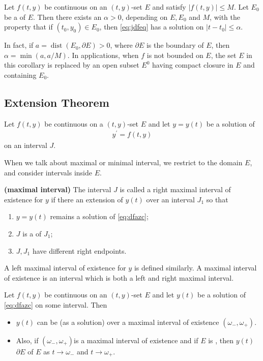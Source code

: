 \documentclass{article}
\newcommand{\bfs}[1]{\textbf{({#1}) }}
\begin{document}
\begin{cora}\label{cor:oeqwklds}
Let $f(t, y)$ be continuous on an  $(t, y)$-set $E$ and satisfy $|f(t, y)| \le M$. Let $E_{0}$ be a  of $E$. Then there exists an $\alpha>0$, depending on $E, E_{0}$ and $M$, with the property that if $\left(t_{0}, y_{0}\right) \in E_{0}$, then \cref{eq:jdfeq} has a solution on $\left|t-t_{0}\right| \le \alpha$.
\end{cora} 
\begin{rema}
In fact, if $a=\operatorname{dist}\left(E_{0}, \partial E\right)>0$, where $\partial E$ is the boundary of $E$, then $\alpha=\min (a, a / M)$. In applications, when $f$ is not bounded on $E$, the set $E$ in this corollary is replaced by an open subset $E^{0}$ having compact closure in $E$ and containing $E_{0}$.

\end{rema}

\subsection{Extension Theorem}
Let $f(t, y)$ be continuous on a $(t, y)$-set $E$ and let $y=y(t)$ be a solution of
\begin{align}
  y^{\prime}=f(t, y)  \label{eq:dfazc}
\end{align}
on an interval $J$. 
\begin{rema}
When we talk about maximal or minimal interval, we restrict to the domain $E$, and consider intervals inside $E$.
\end{rema}
\begin{defa}\bfs{maximal interval}
The interval $J$ is called a right maximal interval of existence for $y$ if there  an extension of $y(t)$ over an interval $J_{1}$ so that
\begin{enumerate}
    \item $y=y(t)$ remains a solution of \cref{eq:dfazc}; 
    \item $J$ is a  of $J_{1}$; 
    \item $J, J_{1}$ have different right endpoints. 
\end{enumerate}

A left maximal interval of existence for $y$ is defined similarly. A maximal interval of existence is an interval which is both a left and right maximal interval.
\end{defa}
\begin{thma}\label{thm:extensiontheorem}
Let $f(t, y)$ be continuous on an  $(t, y)$-set $E$ and let $y(t)$ be a solution of \cref{eq:dfazc} on some interval. Then 
\begin{itemize}
    \item $y(t)$ can be  (as a solution) over a maximal interval of existence $\left(\omega_{-}, \omega_{+}\right)$.
    \item Also, if $\left(\omega_{-}, \omega_{+}\right)$is a maximal interval of existence and if $E$ is , then $y(t)$  $\partial E$ of $E$ as $t \rightarrow \omega_{-}$ and $t \rightarrow \omega_{+} .$
\end{itemize} 
\end{thma}
\end{document}
